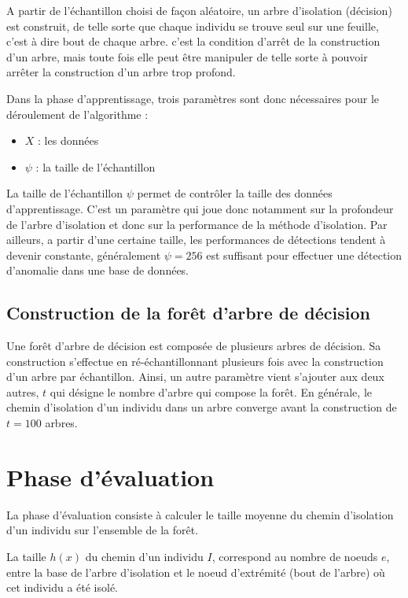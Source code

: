 A partir de l'échantillon choisi de façon aléatoire, un arbre d'isolation (décision) est construit, de telle sorte que chaque individu se trouve seul sur une feuille, c'est à dire bout de chaque arbre. c'est la condition d'arrêt de la construction d'un arbre, mais toute fois elle peut être manipuler de telle sorte à pouvoir arrêter la construction d'un arbre trop profond.

Dans la phase d'apprentissage, trois paramètres sont donc nécessaires pour le déroulement de l'algorithme : 

\begin{itemize}
    \item $X$ : les données
    \item $\psi$ : la taille de l'échantillon
\end{itemize}

La taille de l'échantillon $\psi$ permet de contrôler la taille des données d'apprentissage. C'est un paramètre qui joue donc notamment sur la profondeur de l'arbre d'isolation et donc sur la performance de la méthode d'isolation. Par ailleurs, a partir d'une certaine taille, les performances de détections tendent à devenir constante, généralement $\psi=256$ est suffisant pour effectuer une détection d'anomalie dans une base de données.

\subsection*{Construction de la forêt d'arbre de décision}

Une forêt d'arbre de décision est composée de plusieurs arbres de décision. Sa construction s'effectue en ré-échantillonnant plusieurs fois avec la construction d'un arbre par échantillon. Ainsi, un autre paramètre vient s'ajouter aux deux autres, $t$ qui désigne le nombre d'arbre qui compose la forêt. En générale, le chemin d'isolation d'un individu dans un arbre converge avant la construction de $t=100$ arbres.

\section{Phase d'évaluation}

La phase d'évaluation consiste à calculer le taille moyenne du chemin d'isolation d'un individu sur l'ensemble de la forêt.

La taille $h(x)$ du chemin d'un individu $I$, correspond au nombre de noeuds $e$, entre la base de l'arbre d'isolation et le noeud d'extrémité (bout de l'arbre) où cet individu a été isolé. 

